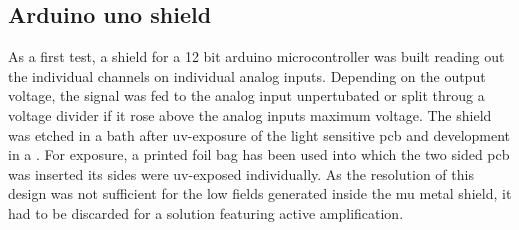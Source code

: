         \subsection{Arduino uno shield}
            As a first test, a shield for a 12 bit arduino microcontroller was built reading out the individual channels on individual analog inputs.  Depending on the output voltage, the signal was fed to the analog input unpertubated or split throug a voltage divider if it rose above the analog inputs maximum voltage.  The shield was etched in a  bath after uv-exposure of the light sensitive pcb and development in a .  For exposure, a printed foil bag has been used into which the two sided pcb was inserted  its sides were uv-exposed individually.  As the resolution of this design was not sufficient for the low fields generated inside the mu metal shield, it had to be discarded for a solution featuring active amplification.
